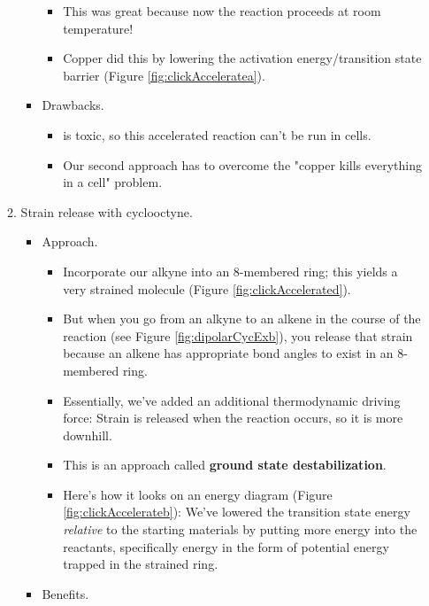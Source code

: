 \documentclass[../notes.tex]{subfiles}
\begin{document}
\begin{itemize}
\begin{enumerate}
\begin{itemize}
            \begin{itemize}
                \item This was great because now the reaction proceeds at room temperature!
                \item Copper did this by lowering the activation energy/transition state barrier (Figure \ref{fig:clickAcceleratea}).
            \end{itemize}
            \item Drawbacks.
            \begin{itemize}
                \item {} is toxic, so this accelerated reaction can't be run in cells.
                \item Our second approach has to overcome the "copper kills everything in a cell" problem.
            \end{itemize}
        \end{itemize}
        \item Strain release with cyclooctyne.
        \begin{itemize}
            \item Approach.
            \begin{itemize}
                \item Incorporate our alkyne into an 8-membered ring; this yields a very strained molecule (Figure \ref{fig:clickAccelerated}).
                \item But when you go from an alkyne to an alkene in the course of the reaction (see Figure \ref{fig:dipolarCycExb}), you release that strain because an alkene has appropriate bond angles to exist in an 8-membered ring.
                \item Essentially, we've added an additional thermodynamic driving force: Strain is released when the reaction occurs, so it is more downhill.
                \item This is an approach called \textbf{ground state destabilization}.
                \item Here's how it looks on an energy diagram (Figure \ref{fig:clickAccelerateb}): We've lowered the transition state energy \emph{relative} to the starting materials by putting more energy into the reactants, specifically energy in the form of potential energy trapped in the strained ring.
            \end{itemize}
            \item Benefits.
            \begin{itemize}

\end{itemize}
\end{itemize}
\end{enumerate}
\end{itemize}
\end{document}
